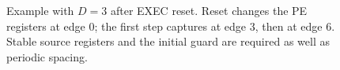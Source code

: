 \begin{figure}[t]
  \centering
  
  \caption{Example with $D=3$ after EXEC reset. Reset changes the PE registers
  at edge 0; the first step captures at edge 3, then at edge 6. Stable source
  registers and the initial guard are required as well as periodic spacing.}
  \label{fig:timing}
\end{figure}
